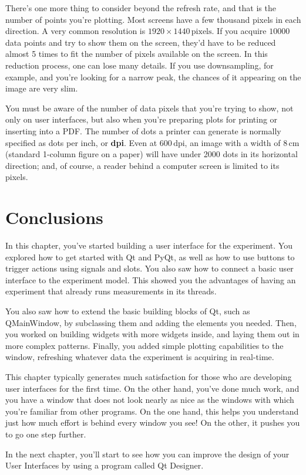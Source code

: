
There's one more thing to consider beyond the refresh rate, and that is the number of points you're plotting. Most screens have a few thousand pixels in each direction. A very common resolution is $1920\times1440\,\textrm{pixels}$. If you acquire $10000$ data points and try to show them on the screen, they'd have to be reduced almost 5 times to fit the number of pixels available on the screen. In this reduction process, one can lose many details. If you use downsampling, for example, and you're looking for a narrow peak, the chances of it appearing on the image are very slim.

You must be aware of the number of data pixels that you're trying to show, not only on user interfaces, but also when you're preparing plots for printing or inserting into a PDF. The number of dots a printer can generate is normally specified as dots per inch, or \textbf{dpi}. Even at $600\,\textrm{dpi}$, an image with a width of $8\,\textrm{cm}$ (standard 1-column figure on a paper) will have under 2000 dots in its horizontal direction; and, of course, a reader behind a computer screen is limited to its pixels.

\section{Conclusions}\label{sec:basic-gui-conclusions}
In this chapter, you've started building a user interface for the experiment. You explored how to get started with Qt and PyQt, as well as how to use buttons to trigger actions using signals and slots. You also saw how to connect a basic user interface to the experiment model. This showed you the advantages of having an experiment that already runs measurements in its threads.

You also saw how to extend the basic building blocks of Qt, such as QMainWindow, by subclassing them and adding the elements you needed. Then, you worked on building widgets with more widgets inside, and laying them out in more complex patterns. Finally, you added simple plotting capabilities to the window, refreshing whatever data the experiment is acquiring in real-time.

This chapter typically generates much satisfaction for those who are developing user interfaces for the first time. On the other hand, you've done much work, and you have a window that does not look nearly as nice as the windows with which you're familiar from other programs. On the one hand, this helps you understand just how much effort is behind every window you see! On the other, it pushes you to go one step further.

In the next chapter, you'll start to see how you can improve the design of your User Interfaces by using a program called Qt Designer.

